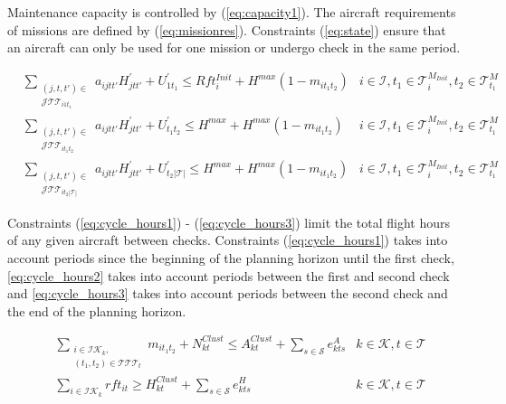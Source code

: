 \documentclass[a4paper,onecolumn,fleqn]{article}
\begin{document}
    Maintenance capacity is controlled by (\ref{eq:capacity1}). The aircraft requirements of missions are defined by (\ref{eq:missionres}). Constraints (\ref{eq:state}) ensure that an aircraft can only be used for one mission or undergo check in the same period.

    \begin{align}
        & \sum_{\substack{(j, t, t') \in \\ \mathcal{J}\mathcal{T}\mathcal{T}_{i1t_1}}} a_{ijtt'} H^\prime_{jtt'} + U^{\prime}_{1t_1} \leq Rft^{Init}_i + H^{max} (1 - m_{it_1t_2}) 
                & i \in \mathcal{I}, t_1 \in \mathcal{T}^{M_{Init}}_i, t_2 \in \mathcal{T}^M_{t_1} \label{eq:cycle_hours1}\\
        & \sum_{\substack{(j, t, t') \in \\ \mathcal{J}\mathcal{T}\mathcal{T}_{it_1t_2}}} a_{ijtt'} H^\prime_{jtt'} + U^{\prime}_{t_1t_2} \leq H^{max} + H^{max} (1 - m_{it_1t_2}) 
                & i \in \mathcal{I}, t_1 \in \mathcal{T}^{M_{Init}}_i, t_2 \in \mathcal{T}^M_{t_1} \label{eq:cycle_hours2}\\
        & \sum_{\substack{(j, t, t') \in \\ \mathcal{J}\mathcal{T}\mathcal{T}_{it_2|\mathcal{T}|}}} a_{ijtt'} H^\prime_{jtt'} + U^{\prime}_{t_2|\mathcal{T}|} \leq H^{max} + H^{max} (1 - m_{it_1t_2}) 
                & i \in \mathcal{I}, t_1 \in \mathcal{T}^{M_{Init}}_i, t_2 \in \mathcal{T}^M_{t_1} \label{eq:cycle_hours3}
    \end{align}

        Constraints (\ref{eq:cycle_hours1}) - (\ref{eq:cycle_hours3}) limit the total flight hours of any given aircraft between checks. Constraints (\ref{eq:cycle_hours1}) takes into account periods since the beginning of the planning horizon until the first check, \ref{eq:cycle_hours2} takes into account periods between the first and second check and \ref{eq:cycle_hours3} takes into account periods between the second check and the end of the planning horizon.

    \begin{align}
       & \sum_{\substack{i \in \mathcal{IK}_k, \\ (t_1, t_2) \in \mathcal{T}\mathcal{T}\mathcal{T}_{t}}} m_{it_1t_2} + N^{Clust}_{kt} \leq A^{Clust}_{kt} + \sum_{s \in \mathcal{S}} e^{A}_{kts}
            & k \in \mathcal{K}, t \in \mathcal{T} \label{eq:serviceability-cluster}\\
       & \sum_{i \in \mathcal{IK}_k} rft_{it} \geq H^{Clust}_{kt} + \sum_{s \in \mathcal{S}} e^{H}_{kts}
            & k \in \mathcal{K}, t \in \mathcal{T} \label{eq:sustainability-cluster}
    \end{align}
\end{document}
